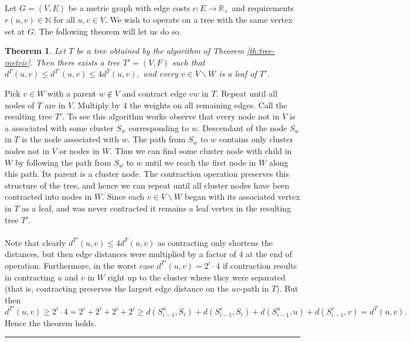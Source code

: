 \documentclass[letterpaper,12pt,oneside,onecolumn]{article}
\newcommand{\N}{\mathbb{N}} \newcommand{\R}{\mathbb{R}}
\newenvironment{proof}{{\bf Proof:  }}{\hfill\rule{2mm}{2mm}}
\newtheorem{theorem}[fact]{Theorem}
\begin{document}
\paragraph{}
Let $G = (V,E)$ be a metric graph with edge costs $c:E \rightarrow \R_+$ and requirements $r(u,v) \in \N$ for all $u,v \in V$. We wish to operate on a tree with the same vertex set at $G$. The following theorem will let us do so.
\begin{theorem}
Let $T$ be a tree obtained by the algorithm of Theorem \ref{th:tree-metric}. Then there exists a tree $T' = (V,F)$ such that $d^T(u,v) \leq d^{T'}(u,v) \leq 4 d^T(u,v),$ and every $v \in V\backslash W$ is a leaf of $T'$.
\end{theorem}
\begin{proof}
Pick $v \in W$ with a parent $w \not \in V$ and contract edge $vw$ in $T$. Repeat until all nodes of $T$ are in $V$. Multiply by $4$ the weights on all remaining edges. Call the resulting tree $T'$. To see this algorithm works observe that every node not in $V$ is a associated with some cluster $S_w$ corresponding to $w$. Descendant of the node $S_w$ in $T$ is the node associated with $w$. The path from $S_w$ to $w$ contains only cluster nodes not in $V$ or nodes in $W$. Thus we can find some cluster node with child in $W$ by following the path from $S_w$ to $w$ until we reach the first node in $W$ along this path. Its parent is a cluster node. The contraction operation preserves this structure of the tree, and hence we can repeat until all cluster nodes have been contracted into nodes in $W$.  Since each $v \in V\backslash W$ began with its associated vertex in $T$ as a leaf, and was never contracted it remains a leaf vertex in the resulting tree $T'$.
\paragraph{}
Note that clearly $d^{T'}(u,v) \leq 4d^T(u,v)$ as contracting only shortens the distances, but then edge distances were multiplied by a factor of $4$ at the end of operation. Furthermore, in the worst case $d^{T'}(u,v) = 2^i \cdot 4$ if contraction results in contracting $u$ and $v$ in $W$ right up to the cluster where they were separated (that is, contracting preserves the largest edge distance on the $uv$-path in $T$). But then
$$d^{T'}(u,v) \geq 2^i \cdot 4 = 2^i + 2^i + 2^i + 2^i \geq d(S^u_{i-1}, S_i) + d(S^v_{i-1}, S_i) +  d(S^u_{i-1}, u) + d(S^v_{i-1}, v) = d^T(u,v).$$
Hence the theorem holds.
\end{proof}
\end{document}
